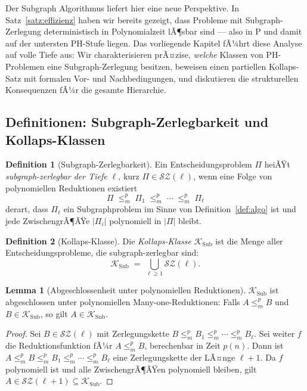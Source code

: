 ﻿\documentclass[a4paper,12pt]{article}
\theoremstyle{definition}
\newtheorem{definition}{Definition}
\newtheorem{lemma}{Lemma}
\begin{document}
Der Subgraph Algorithmus liefert hier eine neue Perspektive.
In Satz~\ref{satz:effizienz} haben wir bereits gezeigt, dass Probleme mit
Subgraph-Zerlegung deterministisch in Polynomialzeit lÃ¶sbar sind --- also in P
und damit auf der untersten PH-Stufe liegen.
Das vorliegende Kapitel fÃ¼hrt diese Analyse auf volle Tiefe aus:
Wir charakterisieren prÃ¤zise, \emph{welche} Klassen von PH-Problemen
eine Subgraph-Zerlegung besitzen, beweisen einen partiellen Kollaps-Satz
mit formalen Vor- und Nachbedingungen, und diskutieren die strukturellen
Konsequenzen fÃ¼r die gesamte Hierarchie.

\subsection{Definitionen: Subgraph-Zerlegbarkeit und Kollaps-Klassen}

\begin{definition}[Subgraph-Zerlegbarkeit]
\label{def:zerlegbar}
  Ein Entscheidungsproblem $\Pi$ heiÃŸt \emph{subgraph-zerlegbar der Tiefe $\ell$},
  kurz $\Pi \in \mathcal{SZ}(\ell)$, wenn eine Folge von polynomiellen
  Reduktionen existiert
  \[
    \Pi \;\leq_m^p\; \Pi_1 \;\leq_m^p\; \cdots \;\leq_m^p\; \Pi_\ell
  \]
  derart, dass $\Pi_\ell$ ein Subgraphproblem im Sinne von Definition~\ref{def:algo}
  ist und jede ZwischengrÃ¶ÃŸe $|\Pi_i|$ polynomiell in $|\Pi|$ bleibt.
\end{definition}

\begin{definition}[Kollaps-Klasse]
\label{def:kollapsklasse}
  Die \emph{Kollaps-Klasse} $\mathcal{K}_\mathrm{Sub}$ ist die Menge aller
  Entscheidungsprobleme, die subgraph-zerlegbar sind:
  \[
    \mathcal{K}_\mathrm{Sub} \;=\; \bigcup_{\ell \geq 1} \mathcal{SZ}(\ell).
  \]
\end{definition}

\begin{lemma}[Abgeschlossenheit unter polynomiellen Reduktionen]
\label{lem:abgeschlossen}
  $\mathcal{K}_\mathrm{Sub}$ ist abgeschlossen unter polynomiellen Many-one-Reduktionen:
  Falls $A \leq_m^p B$ und $B \in \mathcal{K}_\mathrm{Sub}$, so gilt $A \in \mathcal{K}_\mathrm{Sub}$.
\end{lemma}

\begin{proof}
  Sei $B \in \mathcal{SZ}(\ell)$ mit Zerlegungskette
  $B \leq_m^p B_1 \leq_m^p \cdots \leq_m^p B_\ell$.
  Sei weiter $f$ die Reduktionsfunktion fÃ¼r $A \leq_m^p B$, berechenbar in Zeit $p(n)$.
  Dann ist $A \leq_m^p B \leq_m^p B_1 \leq_m^p \cdots \leq_m^p B_\ell$
  eine Zerlegungskette der LÃ¤nge $\ell + 1$.
  Da $f$ polynomiell ist und alle ZwischengrÃ¶ÃŸen polynomiell bleiben,
  gilt $A \in \mathcal{SZ}(\ell+1) \subseteq \mathcal{K}_\mathrm{Sub}$.
\end{proof}
\end{document}
